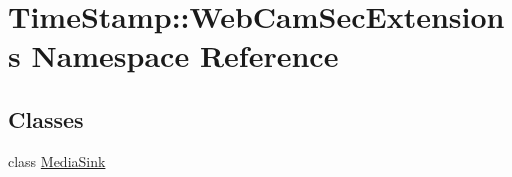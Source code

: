 \hypertarget{namespace_time_stamp_1_1_web_cam_sec_extensions}{}\section{Time\+Stamp\+:\+:Web\+Cam\+Sec\+Extensions Namespace Reference}
\label{namespace_time_stamp_1_1_web_cam_sec_extensions}
\subsection*{Classes}
\begin{DoxyCompactItemize}
\item 
class \hyperlink{class_time_stamp_1_1_web_cam_sec_extensions_1_1_media_sink}{Media\+Sink}
\end{DoxyCompactItemize}
